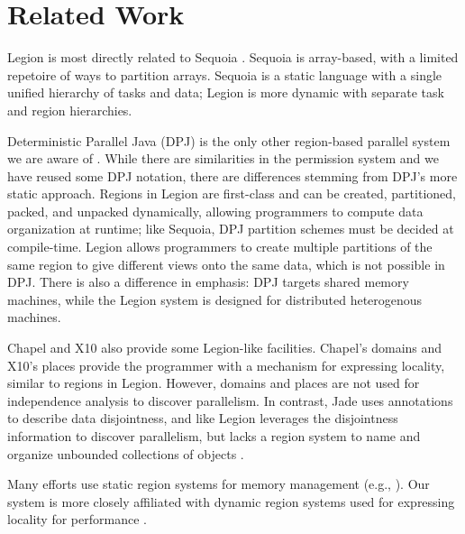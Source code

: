 
\section{Related Work}
\label{sec:related}
Legion is most directly related to Sequoia \cite{Fatahalian06}.  Sequoia is array-based, with
a limited repetoire of ways to partition arrays.  Sequoia is a static language with a single unified hierarchy
of tasks and data; Legion is more dynamic with separate task and region hierarchies.

Deterministic Parallel Java (DPJ) is the only other region-based parallel system we are
aware of \cite{Bocchino09}.  While there are similarities in the permission system and we have
reused some DPJ notation, there are differences stemming from DPJ's more static approach.
Regions in Legion are first-class and can be created, partitioned, packed, and unpacked 
dynamically, allowing programmers to compute data organization at runtime; like Sequoia, DPJ
partition schemes must be decided at compile-time.  Legion allows 
programmers to create multiple partitions of the same region to give different 
views onto the same data, which is not possible in DPJ.  
There is also a difference in emphasis: DPJ targets shared memory machines, while the Legion system
is designed for distributed heterogenous machines.

Chapel \cite{Chamberlain:Chapel} and X10 \cite{X1005} also provide some Legion-like facilities.
Chapel's domains and X10's places provide the programmer with a 
mechanism for expressing locality, similar to regions in Legion.  However, domains
and places are not used for independence analysis to discover parallelism.
In contrast, Jade uses annotations to describe
data disjointness,  and like Legion leverages the disjointness information
to discover parallelism, but lacks a region system to name and organize unbounded collections of objects \cite{Rinard98}.  

Many efforts use static region systems for  memory management (e.g., \cite{Tofte94, Grossman02}).
Our system is more closely affiliated with dynamic region systems used for expressing locality for performance \cite{Gay01}.


